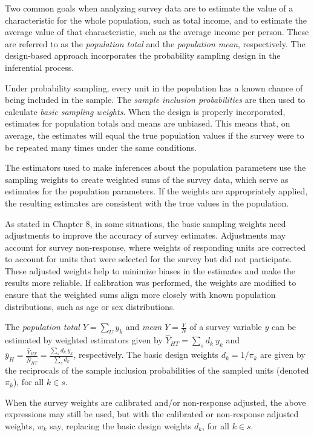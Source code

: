 \documentclass[
  12pt,
]{book}
\begin{document}
Two common goals when analyzing survey data are to estimate the value of a characteristic for the whole population, such as total income, and to estimate the average value of that characteristic, such as the average income per person. These are referred to as the \emph{population total} and the \emph{population mean}, respectively. The design-based approach incorporates the probability sampling design in the inferential process.

Under probability sampling, every unit in the population has a known chance of being included in the sample. The \emph{sample inclusion probabilities} are then used to calculate \emph{basic sampling weights}. When the design is properly incorporated, estimates for population totals and means are unbiased. This means that, on average, the estimates will equal the true population values if the survey were to be repeated many times under the same conditions.

The estimators used to make inferences about the population parameters use the sampling weights to create weighted sums of the survey data, which serve as estimates for the population parameters. If the weights are appropriately applied, the resulting estimates are consistent with the true values in the population.

As stated in Chapter 8, in some situations, the basic sampling weights need adjustments to improve the accuracy of survey estimates. Adjustments may account for survey non-response, where weights of responding units are corrected to account for units that were selected for the survey but did not participate. These adjusted weights help to minimize biases in the estimates and make the results more reliable. If calibration was performed, the weights are modified to ensure that the weighted sums align more closely with known population distributions, such as age or sex distributions.

The \emph{population total} \(Y = \sum _{U} y_k\) and \emph{mean} \(\overline Y = \frac Y N\) of a survey variable \(y\) can be estimated by weighted estimators given by \(\widehat Y _{HT} = \sum _{s} d_k \ y_k\) and \(\overline y_{H} = \frac {\widehat Y_{HT}} {\widehat N_{HT}} = \frac {\sum_{s} d_k \ y_k} {\sum_{s} d_k}\), respectively. The basic design weights \(d_k = 1 / \pi_k\) are given by the reciprocals of the sample inclusion probabilities of the sampled units (denoted \(\pi_k\)), for all \(k \in s\).

When the survey weights are calibrated and/or non-response adjusted, the above expressions may still be used, but with the calibrated or non-response adjusted weights, \(w_k\) say, replacing the basic design weights \(d_k\), for all \(k \in s\).
\end{document}
